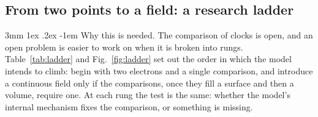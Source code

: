 \documentclass[%
 reprint, amsmath,amssymb, aps, prb, ]{revtex4-2}
\makeatletter
\numberwithin{equation}{section}
\renewcommand\paragraph{%
  \@startsection{paragraph}{4}{\z@}%
    {3mm \@plus 1ex \@minus .2ex}
    {-1em}
    {\normalfont\normalsize\itshape}}
\makeatother
\begin{document}
\subsection{From two points to a field: a research ladder}

\paragraph{Why this is needed.} The comparison of clocks is open, and an open problem is easier to work on when it is broken into rungs. Table~\ref{tab:ladder} and Fig.~\ref{fig:ladder} set out the order in which the model intends to climb: begin with two electrons and a single comparison, and introduce a continuous field only if the comparisons, once they fill a surface and then a volume, require one. At each rung the test is the same: whether the model's internal mechanism fixes the comparison, or something is missing.
\end{document}
